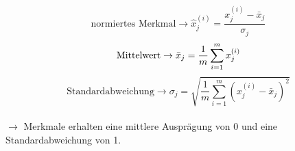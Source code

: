 \begin{equation*}
    \text{normiertes Merkmal}\rightarrow\hat{x}^{(i)}_j = \frac{x^{(i)}_j-\bar{x}_j}{\sigma_j}
\end{equation*}
\begin{equation*}
    \text{Mittelwert}\rightarrow\bar{x}_j = \frac{1}{m}\sum_{i=1}^{m}x^{(i)}_j\\
\end{equation*}
\begin{equation*}
    \text{Standardabweichung}\rightarrow\sigma_j = \sqrt{\frac{1}{m}\sum_{i=1}^{m}(x^{(i)}_j-\bar{x}_j)^2}
\end{equation*}\\

$\rightarrow$ Merkmale erhalten eine mittlere Ausprägung von 0 und eine Standardabweichung von 1.\\